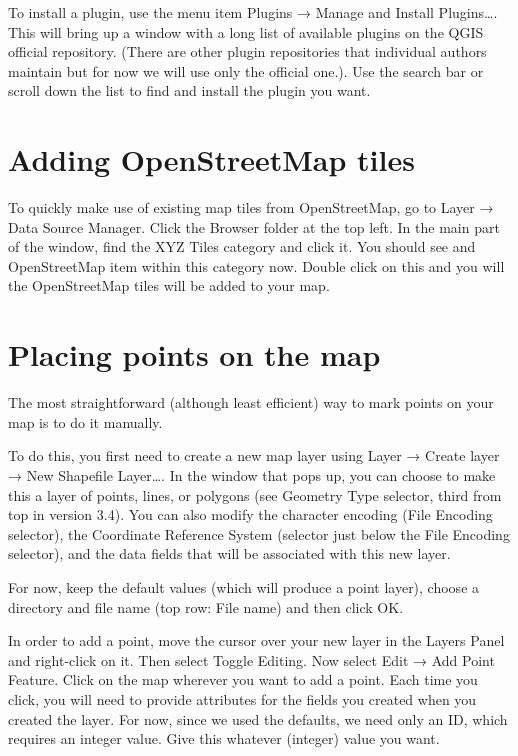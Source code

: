 \documentclass[]{book}
\begin{document}
To install a plugin, use the menu item Plugins → Manage and Install Plugins\ldots{}. This will bring up a window with a long list of available plugins on the QGIS official repository. (There are other plugin repositories that individual authors maintain but for now we will use only the official one.). Use the search bar or scroll down the list to find and install the plugin you want.

\hypertarget{osm-tiles}{%
\section{Adding OpenStreetMap tiles}\label{osm-tiles}}

To quickly make use of existing map tiles from OpenStreetMap, go to Layer → Data Source Manager. Click the Browser folder at the top left. In the main part of the window, find the XYZ Tiles category and click it. You should see and OpenStreetMap item within this category now. Double click on this and you will the OpenStreetMap tiles will be added to your map.

\hypertarget{placing-points-on-the-map}{%
\section{Placing points on the map}\label{placing-points-on-the-map}}

The most straightforward (although least efficient) way to mark points on your map is to do it manually.

To do this, you first need to create a new map layer using Layer → Create layer → New Shapefile Layer\ldots{}. In the window that pops up, you can choose to make this a layer of points, lines, or polygons (see Geometry Type selector, third from top in version 3.4). You can also modify the character encoding (File Encoding selector), the Coordinate Reference System (selector just below the File Encoding selector), and the data fields that will be associated with this new layer.

For now, keep the default values (which will produce a point layer), choose a directory and file name (top row: File name) and then click OK.

In order to add a point, move the cursor over your new layer in the Layers Panel and right-click on it. Then select Toggle Editing. Now select Edit → Add Point Feature. Click on the map wherever you want to add a point. Each time you click, you will need to provide attributes for the fields you created when you created the layer. For now, since we used the defaults, we need only an ID, which requires an integer value. Give this whatever (integer) value you want.
\end{document}
